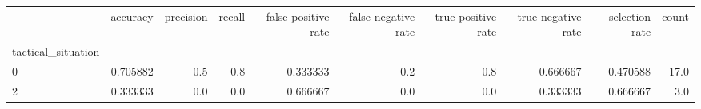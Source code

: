 \begin{tabular}{lrrrrrrrrr}
\toprule
{} &  accuracy &  precision &  recall &  false positive rate &  false negative rate &  true positive rate &  true negative rate &  selection rate &  count \\
tactical\_situation &           &            &         &                      &                      &                     &                     &                 &        \\
\midrule
0                  &  0.705882 &        0.5 &     0.8 &             0.333333 &                  0.2 &                 0.8 &            0.666667 &        0.470588 &   17.0 \\
2                  &  0.333333 &        0.0 &     0.0 &             0.666667 &                  0.0 &                 0.0 &            0.333333 &        0.666667 &    3.0 \\
\bottomrule
\end{tabular}
